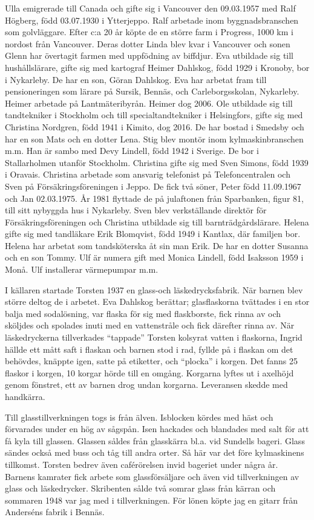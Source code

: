 Ulla emigrerade till Canada och gifte sig i Vancouver den 09.03.1957 med	Ralf Högberg, född 03.07.1930 i Ytterjeppo. Ralf arbetade inom 	byggnadsbranschen som golvläggare. Efter c:a 20 år köpte de en större	farm i Progress, 1000 km i nordost från Vancouver. Deras dotter Linda blev kvar i Vancouver och sonen Glenn har övertagit farmen med 	uppfödning av biffdjur.
Eva utbildade sig till hushållslärare, gifte sig med kartograf Heimer Dahlskog, född 1929 i Kronoby, bor i Nykarleby. De har en son, Göran Dahlskog. Eva har arbetat fram till pensioneringen som lärare på Sursik, Bennäs, och Carleborgsskolan, Nykarleby. Heimer arbetade på Lantmäteribyrån. Heimer dog 2006.
Ole utbildade sig till 	tandtekniker i Stockholm och till specialtandtekniker i Helsingfors, gifte sig med Christina Nordgren, född 1941 i Kimito, dog 2016. De har bostad i Smedsby och har en son Mats och en dotter Lena.
Stig blev montör inom kylmaskinbranschen m.m. Han är sambo med Devy Lindell, född 1942 i 	Sverige. De bor i Stallarholmen utanför Stockholm.
Christina gifte sig 	med Sven Simons, född 1939 i Oravais. Christina arbetade som ansvarig telefonist på Telefoncentralen och Sven på Försäkringsföreningen i Jeppo. De fick två söner, Peter född 11.09.1967 och Jan 02.03.1975.  År 1981 flyttade de på julaftonen från Sparbanken, figur 81, till sitt 	nybyggda hus i Nykarleby. Sven blev verkställande direktör för 	Försäkringsföreningen och Christina utbildade sig till barnträdgårdslärare.
Helena gifte sig med tandläkare Erik Blomqvist, född 1949 i Kantlax, där familjen bor. Helena har arbetat som tandsköterska åt sin man Erik. De 	har en dotter Susanna och en son Tommy.
Ulf är numera gift med Monica Lindell, född Isaksson 1959 i Monå. Ulf installerar värmepumpar 	m.m.

I källaren startade Torsten 1937 en glass-och läskedrycksfabrik. När barnen blev större deltog de i arbetet. Eva Dahlskog berättar; glasflaskorna tvättades i en stor balja med sodalösning, var flaska för sig med flaskborste, fick rinna av och sköljdes och spolades inuti med en vattenstråle och fick därefter rinna av. När läskedryckerna tillverkades ``tappade'' Torsten kolsyrat vatten i flaskorna, Ingrid hällde ett mått saft i flaskan och barnen stod i rad, fyllde på i flaskan om det behövdes,	knäppte igen, satte på etiketter, och ``plocka'' i korgen. Det fanns 25 flaskor i korgen, 10 korgar hörde till en omgång. Korgarna lyftes ut i axelhöjd genom fönstret, ett av barnen drog undan korgarna. Leveransen 	skedde med handkärra.

Till glasstillverkningen togs is från älven. Isblocken kördes med häst och förvarades under en hög av sågspån. Isen hackades och blandades 	med salt för att få kyla till glassen. Glassen såldes från glasskärra bl.a. vid Sundells bageri. Glass sändes också med buss och tåg till andra orter. Så här var det före kylmaskinens tillkomst. Torsten bedrev även caférörelsen invid bageriet under några år. Barnens kamrater fick arbete som glassförsäljare och även vid tillverkningen av glass och läskedrycker. Skribenten sålde två somrar glass från kärran och sommaren 1948 var jag med i tillverkningen. För lönen köpte jag en gitarr från Anderséns fabrik i Bennäs.

